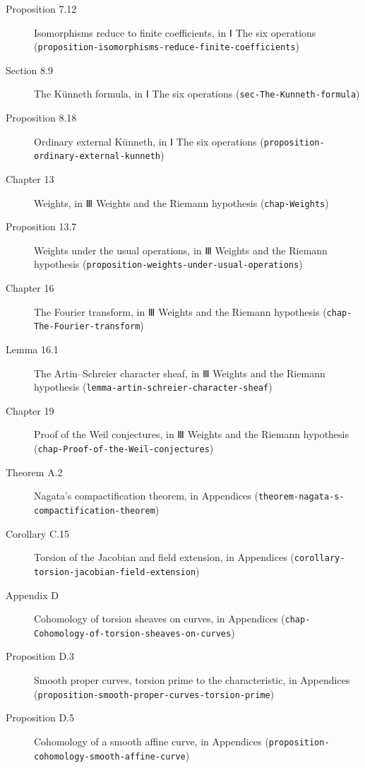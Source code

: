 \documentclass[11pt]{article}
\newcommand{\bpslug}[1]{\texttt{#1}}
\begin{document}
\begin{description}
\item[Proposition 7.12] Isomorphisms reduce to finite coefficients, in Ⅰ The six operations (\bpslug{proposition-{}\allowbreak{}isomorphisms-{}\allowbreak{}reduce-{}\allowbreak{}finite-{}\allowbreak{}coefficients})
\item[Section 8.9] The Künneth formula, in Ⅰ The six operations (\bpslug{sec-{}\allowbreak{}The-{}\allowbreak{}Kunneth-{}\allowbreak{}formula})
\item[Proposition 8.18] Ordinary external Künneth, in Ⅰ The six operations (\bpslug{proposition-{}\allowbreak{}ordinary-{}\allowbreak{}external-{}\allowbreak{}kunneth})
\item[Chapter 13] Weights, in Ⅲ Weights and the Riemann hypothesis (\bpslug{chap-{}\allowbreak{}Weights})
\item[Proposition 13.7] Weights under the usual operations, in Ⅲ Weights and the Riemann hypothesis (\bpslug{proposition-{}\allowbreak{}weights-{}\allowbreak{}under-{}\allowbreak{}usual-{}\allowbreak{}operations})
\item[Chapter 16] The Fourier transform, in Ⅲ Weights and the Riemann hypothesis (\bpslug{chap-{}\allowbreak{}The-{}\allowbreak{}Fourier-{}\allowbreak{}transform})
\item[Lemma 16.1] The Artin–Schreier character sheaf, in Ⅲ Weights and the Riemann hypothesis (\bpslug{lemma-{}\allowbreak{}artin-{}\allowbreak{}schreier-{}\allowbreak{}character-{}\allowbreak{}sheaf})
\item[Chapter 19] Proof of the Weil conjectures, in Ⅲ Weights and the Riemann hypothesis (\bpslug{chap-{}\allowbreak{}Proof-{}\allowbreak{}of-{}\allowbreak{}the-{}\allowbreak{}Weil-{}\allowbreak{}conjectures})
\item[Theorem A.2] Nagata's compactification theorem, in Appendices (\bpslug{theorem-{}\allowbreak{}nagata-{}\allowbreak{}s-{}\allowbreak{}compactification-{}\allowbreak{}theorem})
\item[Corollary C.15] Torsion of the Jacobian and field extension, in Appendices (\bpslug{corollary-{}\allowbreak{}torsion-{}\allowbreak{}jacobian-{}\allowbreak{}field-{}\allowbreak{}extension})
\item[Appendix D] Cohomology of torsion sheaves on curves, in Appendices (\bpslug{chap-{}\allowbreak{}Cohomology-{}\allowbreak{}of-{}\allowbreak{}torsion-{}\allowbreak{}sheaves-{}\allowbreak{}on-{}\allowbreak{}curves})
\item[Proposition D.3] Smooth proper curves, torsion prime to the characteristic, in Appendices (\bpslug{proposition-{}\allowbreak{}smooth-{}\allowbreak{}proper-{}\allowbreak{}curves-{}\allowbreak{}torsion-{}\allowbreak{}prime})
\item[Proposition D.5] Cohomology of a smooth affine curve, in Appendices (\bpslug{proposition-{}\allowbreak{}cohomology-{}\allowbreak{}smooth-{}\allowbreak{}affine-{}\allowbreak{}curve})
\end{description}
\clearpage{}%
\end{document}
